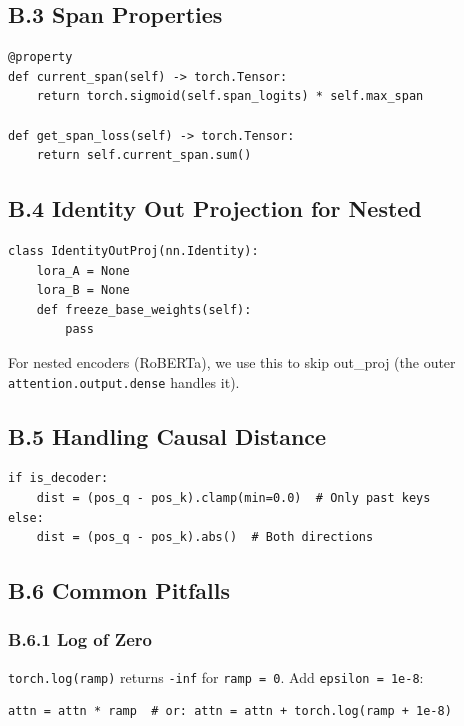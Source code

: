\subsection{B.3 Span Properties}

\begin{lstlisting}
@property
def current_span(self) -> torch.Tensor:
    return torch.sigmoid(self.span_logits) * self.max_span

def get_span_loss(self) -> torch.Tensor:
    return self.current_span.sum()
\end{lstlisting}

\subsection{B.4 Identity Out Projection for Nested}

\begin{lstlisting}
class IdentityOutProj(nn.Identity):
    lora_A = None
    lora_B = None
    def freeze_base_weights(self):
        pass
\end{lstlisting}

For nested encoders (RoBERTa), we use this to skip out\_proj (the outer 
\texttt{attention.output.dense} handles it).

\subsection{B.5 Handling Causal Distance}

\begin{lstlisting}
if is_decoder:
    dist = (pos_q - pos_k).clamp(min=0.0)  # Only past keys
else:
    dist = (pos_q - pos_k).abs()  # Both directions
\end{lstlisting}

\subsection{B.6 Common Pitfalls}

\subsubsection{B.6.1 Log of Zero}

\texttt{torch.log(ramp)} returns \texttt{-inf} for \texttt{ramp = 0}. Add \texttt{epsilon = 1e-8}:
\begin{lstlisting}
attn = attn * ramp  # or: attn = attn + torch.log(ramp + 1e-8)
\end{lstlisting}

